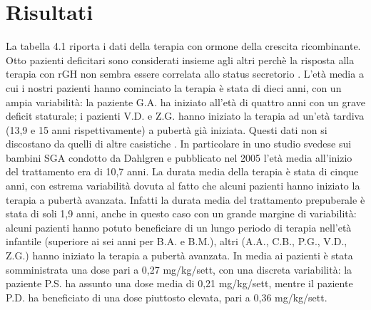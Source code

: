 \chapter{Risultati}

La tabella 4.1 riporta i dati della terapia con ormone della crescita ricombinante. 
Otto pazienti deficitari sono considerati insieme agli altri perchè la risposta alla terapia con rGH non sembra essere correlata allo status secretorio\cite{lee2003international} \cite{de2005growth}.  L'età media a cui i nostri pazienti hanno cominciato la terapia è stata di dieci anni, con un ampia variabilità: la paziente G.A. ha iniziato all'età di quattro anni con un grave deficit staturale; i pazienti V.D. e Z.G. hanno iniziato la terapia ad un'età tardiva (13,9 e 15 anni rispettivamente) a pubertà già iniziata. Questi dati non si discostano da quelli di altre casistiche\cite{coutant1998short} \cite{zucchini2001final}.
In particolare in uno studio svedese sui bambini SGA condotto da Dahlgren e pubblicato nel 2005 l'età media all'inizio del trattamento era di 10,7 anni\cite{dahlgren2005final}.
La durata media della terapia è stata di cinque anni, con estrema variabilità dovuta al fatto che alcuni pazienti hanno iniziato la terapia a pubertà avanzata. Infatti la durata media del trattamento prepuberale è stata di soli 1,9 anni, anche in questo caso con un grande margine di variabilità: alcuni pazienti hanno potuto beneficiare di un lungo periodo di terapia nell'età infantile (superiore ai sei anni per B.A. e B.M.), altri (A.A., C.B., P.G., V.D., Z.G.) hanno iniziato la terapia a pubertà avanzata. 
In media ai pazienti è stata somministrata una dose pari a 0,27 mg/kg/sett, con una discreta variabilità: la paziente P.S. ha assunto una dose media di 0,21 mg/kg/sett, mentre il paziente P.D. ha beneficiato di una dose piuttosto elevata, pari a 0,36 mg/kg/sett. 
  
